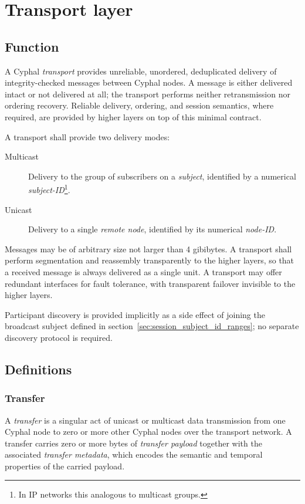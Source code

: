 \chapter{Transport layer}\label{sec:transport}

\section{Function}

A Cyphal \emph{transport} provides unreliable, unordered, deduplicated delivery of integrity-checked messages
between Cyphal nodes. A message is either delivered intact or not delivered at all; the transport performs
neither retransmission nor ordering recovery. Reliable delivery, ordering, and session semantics, where required,
are provided by higher layers on top of this minimal contract.

A transport shall provide two delivery modes:
\begin{description}
    \item[Multicast] Delivery to the group of subscribers on a \emph{subject}, identified by a numerical
    \emph{subject-ID}\footnote{In IP networks this analogous to multicast groups.}.
    \item[Unicast] Delivery to a single \emph{remote node}, identified by its numerical \emph{node-ID}.
\end{description}

Messages may be of arbitrary size not larger than 4 gibibytes.
A transport shall perform segmentation and reassembly transparently to the higher layers,
so that a received message is always delivered as a single unit.
A transport may offer redundant interfaces for fault tolerance,
with transparent failover invisible to the higher layers.

Participant discovery is provided implicitly as a side effect of joining the broadcast subject defined in
section~\ref{sec:session_subject_id_ranges}; no separate discovery protocol is required.

\section{Definitions}

\subsection{Transfer}

A \emph{transfer} is a singular act of unicast or multicast data transmission from one Cyphal node
to zero or more other Cyphal nodes over the transport network.
A transfer carries zero or more bytes of \emph{transfer payload} together with the associated \emph{transfer metadata},
which encodes the semantic and temporal properties of the carried payload.


